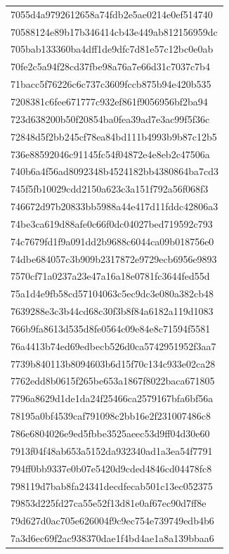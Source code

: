 \begin{tabular}{l}
7055d4a9792612658a74fdb2e5ae0214e0ef514740 \\
70588124e89b17b346414cb43e449ab812156959dc \\
705bab133360ba4dff1de9dfc7d81e57c12bc0e0ab \\
70fe2c5a94f28cd37fbe98a76a7e66d31c7037c7b4 \\
71bacc5f76226c6c737c3609fccb875b94e420b535 \\
7208381c6fee671777c932ef861f9056956bf2ba94 \\
723d638200b50f20854ba0fea39ad7e3ac99f5f36c \\
72848d5f2bb245cf78ea84bd111b4993b9b87c12b5 \\
736e88592046c91145fc54f04872e4e8eb2c47506a \\
740b6a4f56ad8092348b4524182bb4380864ba7cd3 \\
745f5fb10029cdd2150a623c3a151f792a56f068f3 \\
746672d97b20833bb5988a44e417d11fddc42806a3 \\
74be3ca619d88afe0c66f0dc04027bed719592c793 \\
74c7679fd1f9a091dd2b9688c6044ca09b018756e0 \\
74dbe684057c3b909b2317872e9729ecb6956e9893 \\
7570cf71a0237a23e47a16a18e0781fc3644fed55d \\
75a1d4e9fb58cd57104063c5ec9dc3e080a382cb48 \\
7639288e3c3b44cd68c30f3b8f84a6182a119d1083 \\
766b9fa8613d535d8fe0564c09e84e8c71594f5581 \\
76a4413b74ed69edbecb526d0ca5742951952f3aa7 \\
7739b840113b8094603b6d15f70c134c933e02ca28 \\
7762edd8b0615f265be653a1867f8022baca671805 \\
7796a8629d1de1da24f25466ca2579167bfa6bf56a \\
78195a0bf4539caf791098c2bb16e2f231007486c8 \\
786e6804026e9ed5fbbe3525aeec53d9ff04d30e60 \\
7913f04f48ab653a5152da932340ad1a3ea54f7791 \\
794ff0bb9337e0b07e5420d9cded4846cd04478fc8 \\
798119d7bab8fa24341decdfecab501c13ec052375 \\
79853d225fd27ca55e52f13d81e0af67ec90d7ff8e \\
79d627d0ac705e626004f9c9ec754e739749edb4b6 \\
7a3d6ec69f2ac938370dae1f4bd4ae1a8a139bbaa6 \\

\end{tabular}
